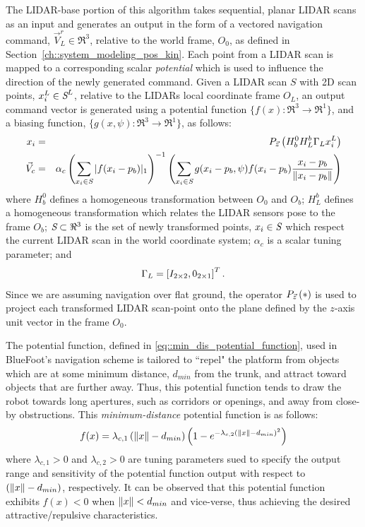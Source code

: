 		The LIDAR-base portion of this algorithm takes sequential, planar LIDAR scans as an input and generates an output in the form of a vectored navigation command, $\vec{V}_{L}^{r}\in \Re^{3}$, relative to the world frame, $O_{0}$, as defined in Section~\ref{ch::system_modeling_pos_kin}. Each point from a LIDAR scan is mapped to a corresponding scalar \emph{potential} which is used to influence the direction of the newly generated command. Given a LIDAR scan $S$ with 2D scan points, $x_{i}^{L}\in\emph{S}^{L}$, relative to the LIDARs local coordinate frame $O_{L}$, an output command vector is generated using a potential function $\{ f(x) : \Re^{3}\rightarrow \Re^{1} \}$, and a biasing function, $\{ g(x,\psi) : \Re^{3}\rightarrow \Re^{1} \}$, as follows:
%
	\begin{eqnarray}
	x_{i}  &=& P_{ \vec{z} } \left( H_{b}^{0} H_{L}^{b} \Gamma_{L} x_{i}^{L} \right) \nonumber \\
	\vec{V}_{c} &=& \alpha_{c} \left(\sum_{x_{i}\in \emph{S}} |f( x_{i}-p_{b})|_{1}\right)^{-1}  \left( \sum_{x_{i} \in \emph{S}} g( x_{i}-p_{b},\psi)  f( x_{i}-p_{b} ) \frac{x_{i}-p_{b}}{\left\lVert x_{i}-p_{b}\right\rVert} \right)
	\end{eqnarray}
	where $H_{b}^{0}$ defines a homogeneous transformation between $O_{0}$ and $O_{b}$; $H_{L}^{b}$ defines a homogeneous transformation which relates the LIDAR sensors pose to the frame $O_{b}$; $\emph{S}\subset \Re^{3}$ is the set of newly transformed points, $x_{i} \in \emph{S}$ which respect the current LIDAR scan in the world coordinate system; $\alpha_{c}$ is a scalar tuning parameter; and 
	\begin{equation*}
		\Gamma_{L} = \left[ I_{2\times2}, 0_{2\times1} \right]^{T}.
	\end{equation*}
Since we are assuming navigation over flat ground, the operator $P_{ \vec{z} }\left(*\right)$ is used to project each transformed LIDAR scan-point onto the plane defined by the $z$-axis unit vector in the frame $O_{0}$.

The potential function, defined in \ref{eq::min_dis_potential_function}, used in BlueFoot's navigation scheme is tailored to ``repel" the platform from objects which are at some minimum distance, $d_{min}$ from the trunk, and attract toward objects that are further away. Thus, this potential function tends to draw the robot towards long apertures, such as corridors or openings, and away from close-by obstructions. This \emph{minimum-distance} potential function is as follows:
	\begin{equation}
		f(x) = \lambda_{c,1}\left(\left\lVert x\right\rVert-d_{min}\right) \left( 1  - e^{ -  \lambda_{c,2} { \left(\left\lVert x\right\rVert-d_{min}\right) }^{2} } \right)
	\label{eq::min_dis_potential_function}
	\end{equation}
where $\lambda_{c,1}>0$ and $\lambda_{c,2}>0$ are tuning parameters sued to specify the output range and sensitivity of the potential function output with respect to $\left(\left\lVert x\right\rVert-d_{min}\right)$, respectively. It can be observed that this potential function exhibits $f(x)<0$ when $\left\lVert x\right\rVert < d_{min}$ and vice-verse, thus achieving the desired attractive/repulsive characteristics.

